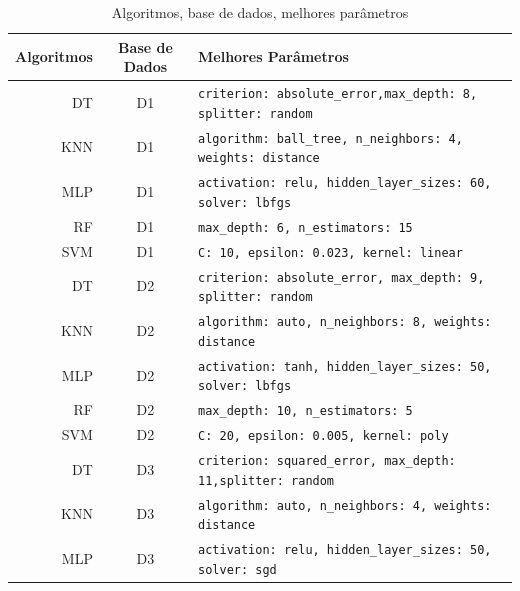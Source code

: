 \documentclass[12pt]{article}
\begin{document}
\begin{table}[h!]
  \begin{center}
    \caption{Algoritmos, base de dados, melhores parâmetros}
    \label{tab_parametros}
    \begin{tabular}{r|c|l}
      \textbf{Algoritmos} & \textbf{Base de Dados} & \textbf{ Melhores Parâmetros}        \\
      \hline
      DT                  & D1                     & \scriptsize{\verb=criterion: absolute_error,max_depth: 8, splitter: random=}  \\ \hline
      KNN                 & D1                     & \scriptsize{\verb=algorithm: ball_tree, n_neighbors: 4, weights: distance=}  \\ \hline
      MLP                 & D1                     & \scriptsize{\verb=activation: relu, hidden_layer_sizes: 60, solver: lbfgs=}  \\ \hline
      RF                  & D1                     & \scriptsize{\verb=max_depth: 6, n_estimators: 15=}  \\ \hline
      SVM                 & D1                     & \scriptsize{\verb=C: 10, epsilon: 0.023, kernel: linear=}  \\ \hline
      DT                  & D2                     & \scriptsize{\verb=criterion: absolute_error, max_depth: 9, splitter: random=}  \\ \hline
      KNN                 & D2                     & \scriptsize{\verb=algorithm: auto, n_neighbors: 8, weights: distance=}  \\ \hline
      MLP                 & D2                     & \scriptsize{\verb=activation: tanh, hidden_layer_sizes: 50, solver: lbfgs=}  \\ \hline
      RF                  & D2                     & \scriptsize{\verb=max_depth: 10, n_estimators: 5=}  \\ \hline
      SVM                 & D2                     & \scriptsize{\verb=C: 20, epsilon: 0.005, kernel: poly=} \\ \hline
      DT                  & D3                     & \scriptsize{\verb=criterion: squared_error, max_depth: 11,splitter: random=} \\ \hline
      KNN                 & D3                     & \scriptsize{\verb=algorithm: auto, n_neighbors: 4, weights: distance=} \\ \hline
      MLP                 & D3                     & \scriptsize{\verb=activation: relu, hidden_layer_sizes: 50,  solver: sgd=} \\ \hline

\end{tabular}
\end{center}
\end{table}
\end{document}
